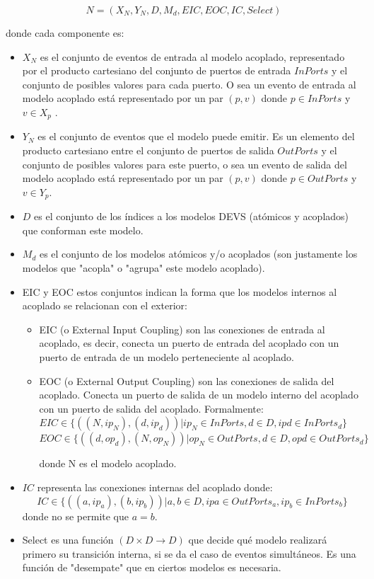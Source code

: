 \documentclass[a4paper,	11pt]{report}
\begin{document}
\begin{equation}
N = (X_N , Y_N , D, {M_d }, EIC, EOC, IC, Select)
\end{equation}

donde cada componente es:
\begin{itemize}
\item $X_N$ es el conjunto de eventos de entrada al modelo acoplado, representado por el producto cartesiano del conjunto de puertos de entrada $InPorts$ y el conjunto de posibles valores para cada puerto. O sea un evento de entrada al modelo acoplado está representado por un par $(p, v)$ donde $p \in InPorts$ y $v \in X_p$ .

\item $Y_N$ es el conjunto de eventos que el modelo puede emitir. Es un elemento del producto cartesiano entre el conjunto de puertos de salida $OutPorts$ y el conjunto de posibles valores para este puerto, o sea un evento de salida del modelo acoplado está representado por un par $(p, v)$ donde $p \in OutPorts$ y $v \in Y_p$.

\item $D$ es el conjunto de los índices a los modelos DEVS (atómicos y acoplados) que conforman este modelo. 

\item ${M_d }$ es el conjunto de los modelos atómicos y/o acoplados (son justamente los modelos que "acopla" o "agrupa" este modelo acoplado).

\item EIC y EOC estos conjuntos indican la forma que los modelos internos al acoplado se relacionan con el exterior:
      \begin {itemize}
          \item EIC (o External Input Coupling) son las conexiones de entrada al acoplado, es decir, conecta un puerto de entrada del acoplado con un puerto de entrada de un modelo perteneciente al acoplado.
          \item EOC (o External Output Coupling) son las conexiones de salida del acoplado. Conecta un puerto de salida de un modelo interno del acoplado con un puerto de salida del acoplado. Formalmente:
          $ EIC \in \{((N, ip_N ), (d, ip_d )) | ip_N \in InPorts, d \in D, ip d \in InPorts_d \} $
          $EOC \in \{((d, op_d ), (N, op_N ))  | op_N \in OutPorts, d \in D, op d \in OutPorts_d \} $
    
    	donde N es el modelo acoplado.
      \end{itemize}

\item $IC$ representa las conexiones internas del acoplado donde:
\begin{equation}
IC \in \{((a, ip_a ), (b, ip_b )) | a, b \in D, ip a \in OutPorts_a , ip_b \in InPorts_b \}
\end{equation}
donde no se permite que $a = b$.

\item Select es una función $(D \times D \to D)$ que decide qué modelo realizará primero su transición interna, si se da el caso de eventos simultáneos. Es una función de "desempate" que en ciertos modelos es necesaria.
\end{itemize}
\end{document}

